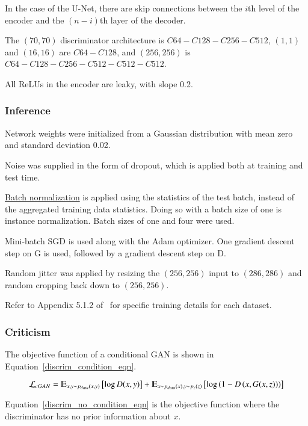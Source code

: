 \documentclass[a4paper, 12pt]{article}
\begin{document}
In the case of the U-Net, there are skip connections between the $i$th level of
the encoder and the $(n - i)$th layer of the decoder.

The $(70, 70)$ discriminator architecture is $C64-C128-C256-C512$, $(1, 1)$ and
$(16, 16)$ are $C64-C128$, and $(256, 256)$ is $C64-C128-C256-C512-C512-C512$.

All ReLUs in the encoder are leaky, with slope 0.2.

\subsubsection{Inference}

Network weights were initialized from a Gaussian distribution with mean zero
and standard deviation 0.02.

Noise was supplied in the form of dropout, which is applied both at training
and test time.

\hyperref[batchnorm]{Batch normalization} is applied using the statistics of
the test batch, instead of the aggregated training data statistics. Doing so
with a batch size of one is instance
normalization\citet{DBLP:journals/corr/UlyanovVL16}. Batch sizes of one and four
were used.

Mini-batch SGD is used along with the Adam optimizer. One gradient descent step
on G is used, followed by a gradient descent step on D.

Random jitter was applied by resizing the $(256, 256)$ input to $(286, 286)$
and random cropping back down to $(256, 256)$.

Refer to Appendix 5.1.2 of~\citet{DBLP:journals/corr/IsolaZZE16} for specific
training details for each dataset.

\subsubsection{Criticism}

The objective function of a conditional GAN is shown in Equation~\ref{discrim_condition_eqn}.

\begin{equation}
        \mathcal{L}_{cGAN} = \varmathbb{E}_{x, y \sim p_{data}(x, y)}\left[\log D(x, y)\right] +
                             \varmathbb{E}_{x \sim p_{data}(x), y \sim p_z (z)}\left[\log \left(1 - D\left(x, G(x, z)\right)\right)\right]
        \label{discrim_condition_eqn}
\end{equation}

Equation~\ref{discrim_no_condition_eqn} is the objective function where the
discriminator has no prior information about $x$.
\end{document}

